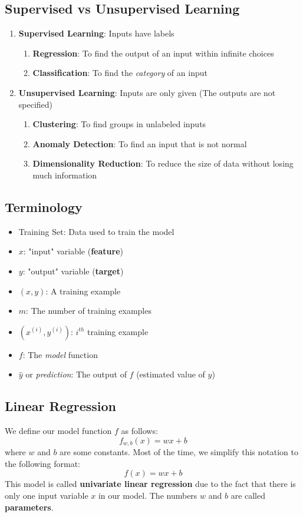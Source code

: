 \documentclass[a4paper, 12pt]{book}
\begin{document}
 \subsection{Supervised vs Unsupervised Learning}
\begin{enumerate}
    \item \textbf{Supervised Learning}: Inputs have labels
    \begin{enumerate}
        \item \textbf{Regression}: To find the output of an input within infinite choices
        \item \textbf{Classification}: To find the \emph{category} of an input
    \end{enumerate}
    \item \textbf{Unsupervised Learning}: Inputs are only given (The outputs are not specified)
    \begin{enumerate}
        \item \textbf{Clustering}: To find groups in unlabeled inputs
        \item \textbf{Anomaly Detection}: To find an input that is not normal
        \item \textbf{Dimensionality Reduction}: To reduce the size of data without losing much information
    \end{enumerate}
\end{enumerate}
\subsection{Terminology}
\begin{itemize}
    \item Training Set: Data used to train the model
    \item $x$: "input" variable (\textbf{feature})
    \item $y$: "output" variable (\textbf{target})
    \item $(x, y)$: A training example
    \item $m$: The number of training examples
    \item $(x^{(i)}, y^{(i)})$: $i^{th}$ training example
    \item $f$: The \emph{model} function
    \item $\hat{y}$ or \emph{prediction}: The output of $f$ (estimated value of $y$)
\end{itemize}
\subsection{Linear Regression}
We define our model function $f$ as follows:\[f_{w,b}(x) = wx + b\] where $w$ and $b$ are some constants. Most of the time, we simplify this notation to the following format:\[f(x) = wx + b\] This model is called \textbf{univariate linear regression} due to the fact that there is only one input variable $x$ in our model. The numbers $w$ and $b$ are called \textbf{parameters}.
\end{document}
